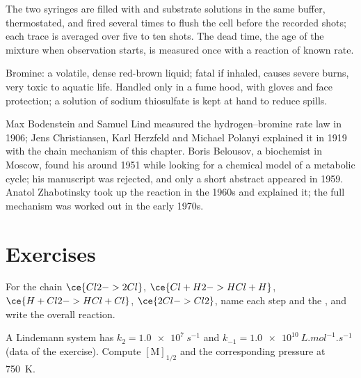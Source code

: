 \begin{inthelab}
The two syringes are filled with  and substrate solutions in the same
buffer, thermostated, and fired several times to flush the cell before the
recorded shots; each trace is averaged over five to ten shots. The dead time,
the age of the mixture when observation starts, is measured once with a
reaction of known rate.
\end{inthelab}

\begin{safety}{}
Bromine: a volatile, dense red-brown liquid; fatal if inhaled, causes severe
burns, very toxic to aquatic life. Handled only in a fume hood, with gloves
and face protection; a solution of sodium thiosulfate is kept at hand to reduce
spills.
\end{safety}

\begin{history}
Max Bodenstein and Samuel Lind measured the hydrogen--bromine rate law in
1906; Jens Christiansen, Karl Herzfeld and Michael Polanyi explained it in
1919 with the chain mechanism of this chapter. Boris Belousov, a biochemist in
Moscow, found his  around 1951 while looking for a
chemical model of a metabolic cycle; his manuscript was rejected, and only a
short abstract appeared in 1959. Anatol Zhabotinsky took up the reaction in
the 1960s and explained it; the full mechanism was worked out in the early
1970s.
\end{history}

\section{Exercises}

\begin{exercise}[$\star$]\label{exo:b3:complex-kinetics:1}
For the chain $\ce{Cl2 -> 2 Cl}$, $\ce{Cl + H2 -> HCl + H}$, $\ce{H + Cl2 -> HCl + Cl}$, $\ce{2 Cl -> Cl2}$,
name each step and the , and write the overall reaction.
\end{exercise}

\begin{exercise}[$\star$]\label{exo:b3:complex-kinetics:2}
A Lindemann system has $k_2 = \qty{1.0e7}{s^{-1}}$ and $k_{-1} = \qty{1.0e10}{L.mol^{-1}.s^{-1}}$ (data of the
exercise). Compute $[\mathrm M]_{1/2}$ and the corresponding pressure at \qty{750}{K}.
\end{exercise}

